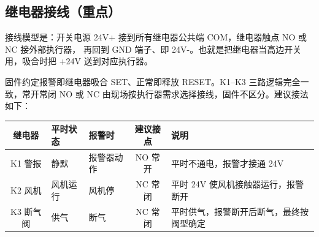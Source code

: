\documentclass[a4paper,11pt]{ctexart}
\begin{document}
\subsection{继电器接线（重点）}
接线模型是：开关电源 24V+ 接到所有继电器公共端 COM，继电器触点 NO 或 NC 接外部执行器，
再回到 GND 端子、即 24V-。也就是把继电器当高边开关用，吸合时把 +24V 送到对应执行器。

\medskip
固件约定报警即继电器吸合 SET、正常即释放 RESET。K1--K3 三路逻辑完全一致，常开常闭
NO 或 NC 由现场按执行器需求选择接线，固件不区分。建议接法如下：

\renewcommand{\arraystretch}{1.3}
\begin{center}
\begin{tabular}{|c|l|l|c|L{4.3cm}|}
\hline
继电器 & 平时状态 & 报警时 & 建议接点 & 说明\\
\hline
K1 警报   & 静默     & 报警器动作 & NO 常开 & 平时不通电，报警才接通 24V\\
\hline
K2 风机   & 风机运行 & 风机停     & NC 常闭 & 平时 24V 使风机接触器运行，报警断开\\
\hline
K3 断气阀 & 供气     & 断气       & NC 常闭 & 平时供气，报警断开后断气，最终按阀型确定\\
\hline
\end{tabular}
\end{center}
\renewcommand{\arraystretch}{1.0}
\end{document}
